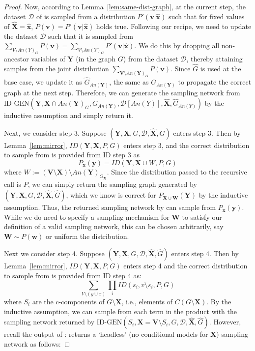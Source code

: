 \documentclass{article}
\newcommand{\red}{\textcolor{red}}
\newcommand{\x}{\mathbf{x}}
\newcommand{\y}{\mathbf{y}}
\newcommand{\X}{\mathbf{X}}
\newcommand{\Xp}{{\hat{\mathbf{X}}}}
\newcommand{\xp}{{\hat{\mathbf{x}}}}
\newcommand{\Gp}{{\hat{{G}}}}
\newcommand{\Y}{\mathbf{Y}}
\newcommand{\V}{\mathbf{V}}
\newcommand{\vb}{\mathbf{v}}
\newcommand{\mbf}{\mathbf}
\newcommand{\data}{\mathcal{D}}
\newcommand{\idgen}{\text{ID-GEN}\xspace}
\newcommand{\idgenpar}{\idgen$(\mathbf{Y}, \mathbf{X},  G,  \data, {\Xp}, \Gp)$\xspace}
\theoremstyle{plain}
\theoremstyle{definition}
\theoremstyle{remark}
\begin{document}
\begin{proof}
Now, according to Lemma~\ref{lem:same-dist-graph}, at the current step, the dataset $\data$ of \idgen is sampled from a distribution $P'(\vb|\xp)$ such that 
for fixed values of $\Xp=\xp$, $P(\vb) = P'(\vb|\xp)$ holds true.
  Following our recipe, we need to update the dataset $\data$ such that it is sampled from $\sum_{V\setminus An(Y)_G} P(\vb)
  =\sum_{V\setminus An(Y)_G} P'(\vb|\xp)
  $.
		We do this by dropping all non-ancestor variables  of $\Y$ (in the graph $G$) from the dataset $\data$, thereby attaining samples from the joint distribution $\sum_{\V\setminus An(\Y)_G} P(\vb)$. 
		Since $\Gp$ is used at the base case, we update it as $\Gp_{An(\Y)}$, the same as $G_{An(\Y)}$ to propagate the correct graph at the next step. Therefore, we can generate the sampling network from $\idgen(\Y, \X\cap An(\Y)_G, G_{An(\Y)}, \data[An(Y)],  \Xp, 
		\Gp_{An(Y)})$ by the inductive assumption and simply return it.
		
		Next, we consider step 3. Suppose \idgenpar enters step 3. Then by Lemma~\ref{lem:mirror}, $ID(\Y, \X, P, G)$ enters step 3, and the correct distribution to sample from is provided from ID step 3 as
		\[
		P_{\x}(\y) = ID(\Y, \X\cup W, P, G)
		\]
		where $W:= (\V\setminus \X)\setminus An(\Y)_{G_{\overline{\X}}}$. Since the distribution passed to the recursive call is $P$, we can simply return the sampling graph generated by \idgenpar, which we know is correct for $P_{\X\cup \mbf{W}}(\Y)$ by the inductive assumption.
		Thus, the returned sampling network by \idgen can sample from $P_{\x}(\y)$.
		While we do need to specify a sampling mechanism for $\mbf{W}$ to satisfy our definition of a valid sampling network, this can be chosen arbitrarily, say $\mbf{W}\sim P(\mbf{w})$ or uniform the distribution. 
		
		
		Next we consider step 4. Suppose \idgenpar enters step 4. Then by Lemma~\ref{lem:mirror}, $ID(\Y,\X, P, G)$ enters step 4 and the correct distribution to sample from is provided from ID step 4 as:
		\[
		\sum_{V\setminus(y\cup x)}\prod_i ID(s_i, v\setminus s_i, P, G)
		\]
		where $S_i$ are the c-components of $G\setminus \X$, i.e., elements of $C(G\setminus \X)$. By the inductive assumption, we can sample from each term in the product with the sampling network returned by $\idgen(S_{i}, \mathbf{X}=\mathbf{V} \setminus S_{i}, G, \data, {\Xp}, \Gp)$. However, recall the output of \idgen: \idgen returns a `headless' (no conditional models for $\X$) sampling network as follows: %
		

\end{proof}
\end{document}
